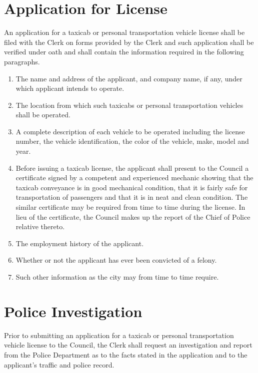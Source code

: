 \section{Application for License}
An application for a taxicab or personal transportation vehicle license shall be filed with the Clerk on forms provided by the Clerk and such application shall be verified under oath and shall contain the information required in the following paragraphs.
\begin{enumerate}[{\indent}A)]
    \item The name and address of the applicant, and company name, if any, under which applicant intends to operate.
    \item The location from which such taxicabs or personal transportation vehicles shall be operated.
    \item A complete description of each vehicle to be operated including the license number, the vehicle identification, the color of the vehicle, make, model and year.
    \item Before issuing a taxicab license, the applicant shall present to the Council a certificate signed by a competent and experienced mechanic showing that the taxicab conveyance is in good mechanical condition, that it is fairly safe for transportation of passengers and that it is in neat and clean condition.  The similar certificate may be required from time to time during the license.  In lieu of the certificate, the Council makes up the report of the Chief of Police relative thereto.
    \item The employment history of the applicant.
    \item Whether or not the applicant has ever been convicted of a felony.
    \item Such other information as the city may from time to time require.
\end{enumerate}

\section{Police Investigation}
Prior to submitting an application for a taxicab or personal transportation vehicle license to the Council, the Clerk shall request an investigation and report from the Police Department as to the facts stated in the application and to the applicant’s traffic and police record.

